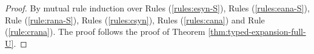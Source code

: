 \begin{proof}
By mutual rule induction over Rules (\ref{rules:esyn-S}), Rules (\ref{rules:eana-S}), Rule (\ref{rule:rana-S}), Rules (\ref{rules:csyn}), Rules (\ref{rules:cana}) and Rule (\ref{rule:crana}). The proof follows the proof of Theorem \ref{thm:typed-expansion-full-U}.

\end{proof}


